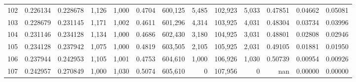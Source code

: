 \begin{tabular}{rrrrrrrrrrrrr}
102 &  0.226134 &  0.228678 &   1,126 &  1,000 &                                     0.4704 &  600,125 &    5,485 &  102,923 &    5,033 &  0.47851 &  0.04662 &  0.05081 \\
103 &  0.228679 &  0.231145 &   1,171 &  1,002 &                                     0.4611 &  601,296 &    4,314 &  103,925 &    4,031 &  0.48304 &  0.03734 &  0.03996 \\
104 &  0.231146 &  0.234128 &   1,134 &  1,000 &                                     0.4686 &  602,430 &    3,180 &  104,925 &    3,031 &  0.48801 &  0.02808 &  0.02946 \\
105 &  0.234128 &  0.237942 &   1,075 &  1,000 &                                     0.4819 &  603,505 &    2,105 &  105,925 &    2,031 &  0.49105 &  0.01881 &  0.01950 \\
106 &  0.237944 &  0.242953 &   1,105 &  1,001 &                                     0.4753 &  604,610 &    1,000 &  106,926 &    1,030 &  0.50739 &  0.00954 &  0.00926 \\
107 &  0.242957 &  0.270849 &   1,000 &  1,030 &                                     0.5074 &  605,610 &        0 &  107,956 &        0 &      nan &  0.00000 &  0.00000 \\
\bottomrule
\end{tabular}
